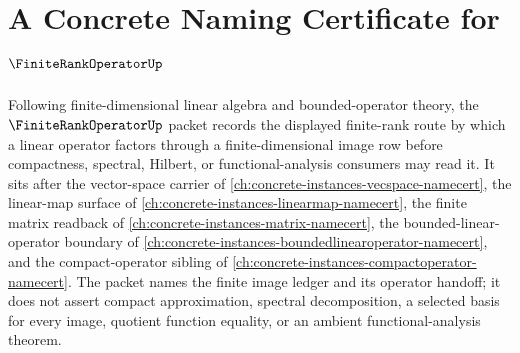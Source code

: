 \chapter{A Concrete Naming Certificate for $\FiniteRankOperatorUp$}
\label{ch:concrete-instances-finite-rank-operator-namecert}

Following finite-dimensional linear algebra and bounded-operator theory, the $\FiniteRankOperatorUp$ packet records the displayed finite-rank route by which a linear operator factors through a finite-dimensional image row before compactness, spectral, Hilbert, or functional-analysis consumers may read it. It sits after the vector-space carrier of \autoref{ch:concrete-instances-vecspace-namecert}, the linear-map surface of \autoref{ch:concrete-instances-linearmap-namecert}, the finite matrix readback of \autoref{ch:concrete-instances-matrix-namecert}, the bounded-linear-operator boundary of \autoref{ch:concrete-instances-boundedlinearoperator-namecert}, and the compact-operator sibling of \autoref{ch:concrete-instances-compactoperator-namecert}. The packet names the finite image ledger and its operator handoff; it does not assert compact approximation, spectral decomposition, a selected basis for every image, quotient function equality, or an ambient functional-analysis theorem.

